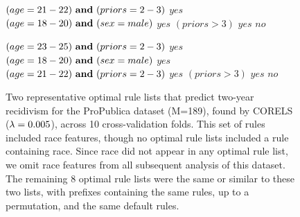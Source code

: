 %
\begin{figure}[t!]
\begin{algorithmic}
\State \bif $(age = 21-22) {\bf ~and~} (priors = 2-3)$ \bthen $yes$
\State \belif $(age = 18-20){\bf ~and~} (sex = male)$ \bthen $yes$
\State \belif $(priors > 3)$ \bthen $yes$
\State \belse $no$
\end{algorithmic}
\vspace{1mm}
\begin{algorithmic}
\State \bif $(age = 23-25) {\bf ~and~} (priors = 2-3)$ \bthen $yes$
\State \belif $(age = 18-20){\bf ~and~} (sex = male)$ \bthen $yes$
\State \belif $(age = 21-22) {\bf ~and~} (priors = 2-3)$ \bthen $yes$
\State \belif $(priors > 3)$ \bthen $yes$
\State \belse $no$
\end{algorithmic}
\caption{Two representative optimal rule lists that predict two-year recidivism for the
ProPublica dataset (M=189), found by CORELS (${{\lambda} = 0.005}$), across 10 cross-validation folds.
%
This set of rules included race features, though no optimal rule lists included a rule containing race.
%
Since race did not appear in any optimal rule list, we omit race features from all subsequent analysis of this dataset.
%
The remaining 8 optimal rule lists were the same or similar to these two lists, with prefixes containing the same rules, up to a permutation,
and the same default rules.
}
\label{fig:propublica}
\end{figure}
%
